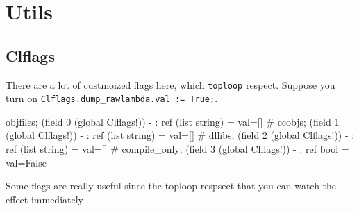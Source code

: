 \section{Utils}


\subsection{Clflags}

There are a lot of custmoized flags here, which \verb|toploop| respect.
Suppose you turn on \verb|Clflags.dump_rawlambda.val := True;|.


\begin{ocamlcode}
objfiles;
(field 0 (global Clflags!))
- : ref (list string) = {val=[]}
# ccobjs;
(field 1 (global Clflags!))
- : ref (list string) = {val=[]}
# dllibs;
(field 2 (global Clflags!))
- : ref (list string) = {val=[]}
# compile_only;
(field 3 (global Clflags!))
- : ref bool = {val=False}
\end{ocamlcode}


Some flags are really useful since the toploop respsect that you can
watch the effect immediately

